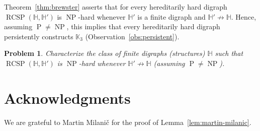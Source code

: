 \documentclass{article}
\newtheorem{problem}[question]{Problem}
\theoremstyle{definition}
\theoremstyle{remark}
\DeclareMathOperator{\NP}{NP}
\DeclareMathOperator{\cP}{P}
\DeclareMathOperator{\RCSP}{RCSP}
\newcommand{\bH}{{\mathbb H}}
\newcommand{\bK}{{\mathbb K}}
\begin{document}
Theorem~\ref{thm:brewster} asserts that for every hereditarily hard digraph $\RCSP(\bH,\bH')$
is $\NP$-hard whenever $\bH'$ is a finite digraph and $\bH'\not\to\bH$. Hence, assuming
$\cP\neq \NP$, this implies that every hereditarily hard digraph persistently constructs
$\bK_3$ (Observation~\ref{obs:persistent}).

\begin{problem}
    Characterize the class of finite digraphs (structures) $\bH$ such that $\RCSP(\bH,\bH')$
    is $\NP$-hard whenever $\bH'\not\to \bH$ (assuming $\cP\neq \NP$).
\end{problem}

\section*{Acknowledgments}
We are grateful to Martin Milani\v{c} for the proof of Lemma~\ref{lem:martin-milanic}.




\end{document}
